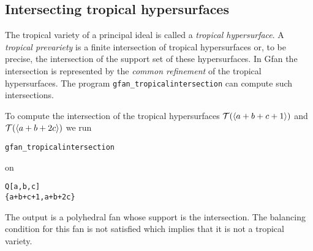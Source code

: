 \subsection{Intersecting tropical hypersurfaces}
The tropical variety of a principal ideal is called a \emph{tropical
hypersurface}. A \emph{tropical prevariety} is a finite intersection of
tropical hypersurfaces or, to be precise, the intersection of the
support set of these hypersurfaces. In Gfan the intersection is
represented by the \emph{common refinement} of the tropical
hypersurfaces. The program \texttt{gfan\_tropicalintersection} can
compute such intersections.
\begin{example}
To compute the intersection of the tropical hypersurfaces $ \mathcal{T} (\langle a+b+c+1\rangle)$ and $ \mathcal{T} (\langle a+b+2c\rangle)$ we run
\begin{verbatim}
gfan_tropicalintersection
\end{verbatim} 
on
\begin{verbatim}
Q[a,b,c]
{a+b+c+1,a+b+2c}
\end{verbatim}
The output is a polyhedral fan whose support is the intersection. The
balancing condition for this fan is not satisfied which implies that it
is not a tropical variety.


\end{example}

